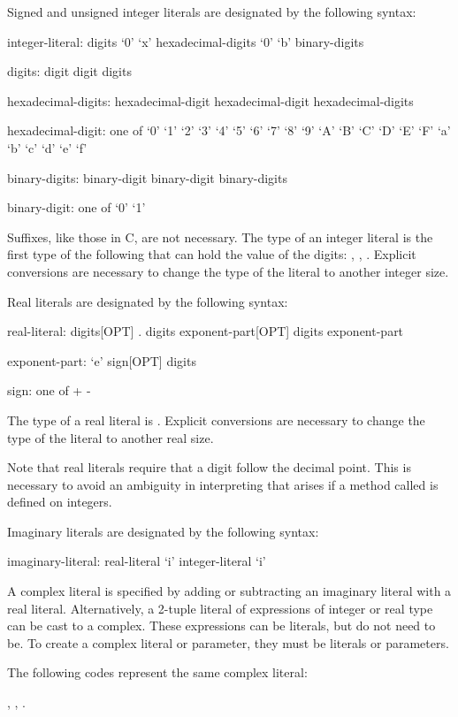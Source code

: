 Signed and unsigned integer literals are designated by the following
syntax:
\begin{syntax}
integer-literal:
  digits
  `0' `x' hexadecimal-digits
  `0' `b' binary-digits

digits:
  digit
  digit digits

hexadecimal-digits:
  hexadecimal-digit
  hexadecimal-digit hexadecimal-digits

hexadecimal-digit: one of
  `0' `1' `2' `3' `4' `5' `6' `7' `8' `9' `A' `B' `C' `D' `E' `F' `a' `b' `c' `d' `e' `f'

binary-digits:
  binary-digit
  binary-digit binary-digits

binary-digit: one of
  `0' `1'
\end{syntax}
Suffixes, like those in C, are not necessary.  The type of an integer
literal is the first type of the following that can hold the value of
the digits: , , .  Explicit
conversions are necessary to change the type of the literal to another
integer size.

Real literals are designated by the following syntax:
\begin{syntax}
real-literal:
  digits[OPT] . digits exponent-part[OPT]
  digits exponent-part

exponent-part:
  `e' sign[OPT] digits

sign: one of
  + -
\end{syntax}
The type of a real literal is .  Explicit conversions are
necessary to change the type of the literal to another real
size.

Note that real literals require that a digit follow the
decimal point.  This is necessary to avoid an ambiguity in
interpreting  that arises if a method called  is
defined on integers.

Imaginary literals are designated by the following syntax:
\begin{syntax}
imaginary-literal:
  real-literal `i'
  integer-literal `i'
\end{syntax}

A complex literal is specified by adding or subtracting an imaginary
literal with a real literal.  Alternatively, a 2-tuple literal of
expressions of integer or real type can be cast to a complex.  These
expressions can be literals, but do not need to be.  To create a
complex literal or parameter, they must be literals or parameters.

\begin{example}
The following codes represent the same complex literal:
\begin{center}
, \hspace{1pc} , \hspace{1pc}
.
\end{center}
\end{example}

